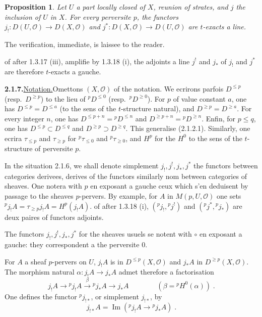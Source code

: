 \documentclass[12pt,a4paper]{article}
\theoremstyle{plain}
\newtheorem{proposition}[theorem]{Proposition}
\theoremstyle{definition}
\DeclareMathOperator{\im}{Im}
\begin{document}
\begin{proposition}\label{prop:2.1.6}
Let $U$ a part locally closed of $X$, reunion of strates, and $j$ the inclusion of $U$ in $X$. For every perversite $p$, the functors $j_! : D(U, \mathcal{O}) \to D(X, \mathcal{O})$ and $j^* : D(X, \mathcal{O}) \to D(U, \mathcal{O})$ are $t$-exacts a line.
\end{proposition}

The verification, immediate, is laissee to the reader.

of after 1.3.17 (iii), amplifie by 1.3.18 (i), the adjoints a line $j^!$ and $j_*$ of $j_!$ and $j^*$ are therefore $t$-exacts a gauche.

\smallskip
\noindent\textbf{2.1.7.}\quad \underline{Notation.}\quad Omettons $(X, \mathcal{O})$ of the notation. We ecrirons parfois $D^{\leqslant p}$ (resp.\ $D^{\geqslant p}$) to the lieu of ${}^p D^{\leqslant 0}$ (resp.\ ${}^p D^{\geqslant 0}$). For $p$ of value constant $a$, one has $D^{\leqslant p} = D^{\leqslant a}$ (to the sens of the $t$-structure natural), and $D^{\geqslant p} = D^{\geqslant a}$. For every integer $n$, one has $D^{\leqslant p+n} = {}^p D^{\leqslant n}$ and $D^{\geqslant p+n} = {}^p D^{\geqslant n}$. Enfin, for $p \leqslant q$, one has $D^{\leqslant p} \subset D^{\leqslant q}$ and $D^{\geqslant p} \supset D^{\geqslant q}$. This generalise (2.1.2.1). Similarly, one ecrira $\tau_{\leqslant p}$ and $\tau_{\geqslant p}$ for ${}^p \tau_{\leqslant 0}$ and ${}^p \tau_{\geqslant 0}$, and $H^p$ for the $H^0$ to the sens of the $t$-structure of perversite $p$.

In the situation 2.1.6, we shall denote simplement $j_!, j^!, j_*, j^*$ the functors between categories derivees, derives of the functors similarly nom between categories of sheaves. One notera with $p$ en exposant a gauche ceux which s'en deduisent by passage to the sheaves $p$-pervers. By example, for $A$ in $M(p, U, \mathcal{O})$ one sets ${}^p j_! A = \tau_{\geqslant p} j_! A = H^p(j_! A)$. of after 1.3.18 (i), $({}^p j_!, {}^p j^!)$ and $({}^p j^*, {}^p j_*)$ are deux paires of functors adjoints.

The functors $j_!, j^!, j_*, j^*$ for the sheaves usuels se notent with $\circ$ en exposant a gauche: they correspondent a the perversite 0.

For $A$ a sheaf $p$-pervers on $U$, $j_! A$ is in $D^{\leqslant p}(X, \mathcal{O})$ and $j_* A$ in $D^{\geqslant p}(X, \mathcal{O})$. The morphism natural $\alpha : j_! A \to j_* A$ admet therefore a factorisation
\[
j_! A \to {}^p j_! A \xrightarrow{\;\beta\;} {}^p j_* A \to j_* A \qquad\qquad (\beta = {}^p H^0(\alpha))\;.
\]
One defines the functor ${}^p j_{!*}$, or simplement $j_{!*}$, by
\[
j_{!*} A = \im({}^p j_! A \to {}^p j_* A)\;.
\]
\end{document}
